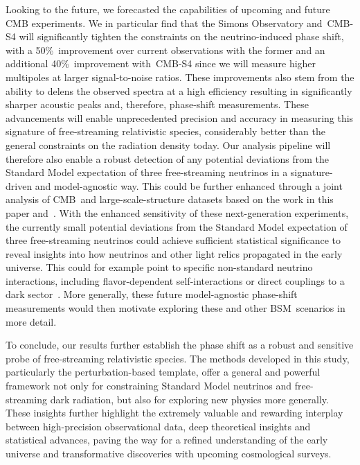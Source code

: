 Looking to the future, we forecasted the capabilities of upcoming and future CMB experiments. We in particular find that the Simons Observatory and~\mbox{CMB-S4} will significantly tighten the constraints on the neutrino-induced phase shift, with a 50\%~improvement over current observations with the former and an additional 40\%~improvement with~\mbox{CMB-S4} since we will measure higher multipoles at larger signal-to-noise ratios. These improvements also stem from the ability to delens the observed spectra at a high efficiency resulting in significantly sharper acoustic peaks and, therefore, phase-shift measurements. These advancements will enable unprecedented precision and accuracy in measuring this signature of free-streaming relativistic species, considerably better than the general constraints on the radiation density today. Our analysis pipeline will therefore also enable a robust detection of any potential deviations from the Standard Model expectation of three free-streaming neutrinos in a signature-driven and model-agnostic way. This could be further enhanced through a joint analysis of CMB~and large-scale-structure datasets based on the work in this paper and~\cite{Baumann:2017gkg, Baumann:2019keh, Whitford:2024ecj}. With the enhanced sensitivity of these next-generation experiments, the currently small potential deviations from the Standard Model expectation of three free-streaming neutrinos could achieve sufficient statistical significance to reveal insights into how neutrinos and other light relics propagated in the early universe. This could for example point to specific non-standard neutrino interactions, including flavor-dependent self-interactions or direct couplings to a dark sector~\cite{Jeong:2013eza, Chacko:2016kgg, Buen-Abad:2017gxg, Green:2021gdc, Berryman:2022hds, Adshead:2022ovo, Buen-Abad:2024tlb, Kaplan:2024ydw}. More generally, these future model-agnostic phase-shift measurements would then motivate exploring these and other BSM~scenarios in more detail.\medskip

To conclude, our results further establish the phase shift as a robust and sensitive probe of free-streaming relativistic species. The methods developed in this study, particularly the perturbation-based template, offer a general and powerful framework not only for constraining Standard Model neutrinos and free-streaming dark radiation, but also for exploring new physics more generally. These insights further highlight the extremely valuable and rewarding interplay between high-precision observational data, deep theoretical insights and statistical advances, paving the way for a refined understanding of the early universe and transformative discoveries with upcoming cosmological surveys.




